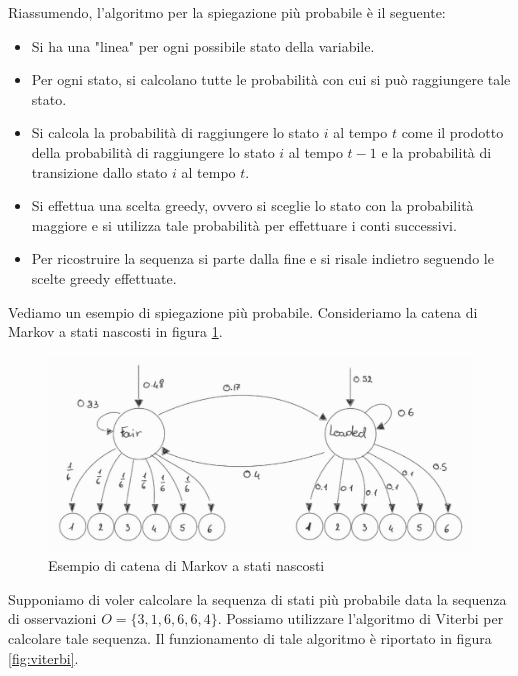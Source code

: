 \begin{itemize}
          Riassumendo, l'algoritmo per la spiegazione più probabile è il seguente:
          \begin{itemize}
              \item Si ha una "linea" per ogni possibile stato della variabile.
              \item Per ogni stato, si calcolano tutte le probabilità con cui
                    si può raggiungere tale stato.
              \item Si calcola la probabilità di raggiungere lo stato $i$ al tempo
                    $t$ come il prodotto della probabilità di raggiungere lo stato
                    $i$ al tempo $t-1$ e la probabilità di transizione dallo
                    stato $i$ al tempo $t$.
              \item Si effettua una scelta greedy, ovvero si sceglie lo stato con
                    la probabilità maggiore e si utilizza tale probabilità per
                    effettuare i conti successivi.
              \item Per ricostruire la sequenza si parte dalla fine e si risale
                    indietro seguendo le scelte greedy effettuate.
          \end{itemize}
          \begin{esempio}
              Vediamo un esempio di spiegazione più probabile. Consideriamo la
              catena di Markov a stati nascosti in figura \ref{fig:dado}.
              \begin{figure}[!ht]
                  \centering
                  \includegraphics[width=.5\textwidth]{img/catene/dado.png}
                  \caption{Esempio di catena di Markov a stati nascosti}
                  \label{fig:dado}
              \end{figure}
              Supponiamo di voler calcolare la sequenza di stati più probabile
              data la sequenza di osservazioni $O = \{3, 1, 6, 6, 6, 4\}$. Possiamo
              utilizzare l'algoritmo di Viterbi per calcolare tale sequenza.
              Il funzionamento di tale algoritmo è riportato in figura \ref{fig:viterbi}.
              \begin{figure}[!ht]
                  \centering

\end{figure}
\end{esempio}
\end{itemize}
